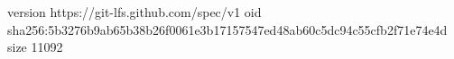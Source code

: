 version https://git-lfs.github.com/spec/v1
oid sha256:5b3276b9ab65b38b26f0061e3b17157547ed48ab60c5dc94c55cfb2f71e74e4d
size 11092
